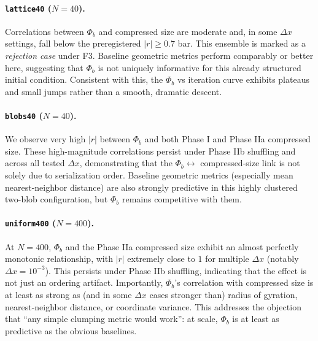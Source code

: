\documentclass[11pt,a4paper]{article}
\numberwithin{equation}{section}
\newcommand{\phib}{\Phi_b}
\begin{document}
\paragraph{\texttt{lattice40} ($N{=}40$).}
Correlations between $\phib$ and compressed size are moderate and, in some $\Delta x$ settings, fall below the preregistered $|r|\ge 0.7$ bar. This ensemble is marked as a \emph{rejection case} under F3. Baseline geometric metrics perform comparably or better here, suggesting that $\phib$ is not uniquely informative for this already structured initial condition. Consistent with this, the $\phib$ vs iteration curve exhibits plateaus and small jumps rather than a smooth, dramatic descent.

\paragraph{\texttt{blobs40} ($N{=}40$).}
We observe very high $|r|$ between $\phib$ and both Phase I and Phase IIa compressed size. These high-magnitude correlations persist under Phase IIb shuffling and across all tested $\Delta x$, demonstrating that the $\phib \leftrightarrow$ compressed-size link is not solely due to serialization order. Baseline geometric metrics (especially mean nearest-neighbor distance) are also strongly predictive in this highly clustered two-blob configuration, but $\phib$ remains competitive with them.

\paragraph{\texttt{uniform400} ($N{=}400$).}
At $N{=}400$, $\phib$ and the Phase IIa compressed size exhibit an almost perfectly monotonic relationship, with $|r|$ extremely close to $1$ for multiple $\Delta x$ (notably $\Delta x=10^{-3}$). This persists under Phase IIb shuffling, indicating that the effect is not just an ordering artifact. Importantly, $\phib$'s correlation with compressed size is at least as strong as (and in some $\Delta x$ cases stronger than) radius of gyration, nearest-neighbor distance, or coordinate variance. This addresses the objection that ``any simple clumping metric would work'': at scale, $\phib$ is at least as predictive as the obvious baselines.
\end{document}

